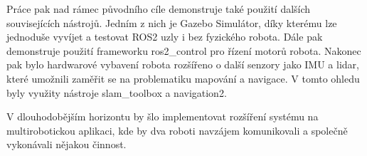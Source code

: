 Práce pak nad rámec původního cíle demonstruje také použití dalších souvisejících nástrojů. Jedním z nich je Gazebo Simulátor, díky kterému lze jednoduše vyvíjet a testovat ROS2 uzly i bez fyzického robota. Dále pak demonstruje použití frameworku ros2\_control pro řízení motorů robota. Nakonec pak bylo hardwarové vybavení robota rozšířeno o další senzory jako IMU a lidar, které umožnili zaměřit se na problematiku mapování a navigace. V tomto ohledu byly využity nástroje slam\_toolbox a navigation2.

V dlouhodobějším horizontu by šlo implementovat rozšíření systému na multirobotickou aplikaci, kde by dva roboti navzájem komunikovali a společně vykonávali nějakou činnost.


%
